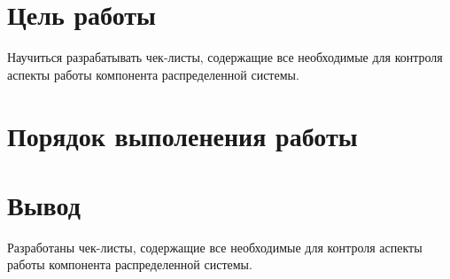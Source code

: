 \section{Цель работы}
	Научиться разрабатывать чек-листы, содержащие все необходимые для контроля аспекты работы компонента распределенной системы.
		
\section{Порядок выполенения работы}

	
	

\section{Вывод}
	Разработаны чек-листы, содержащие все необходимые для контроля аспекты работы компонента распределенной системы.